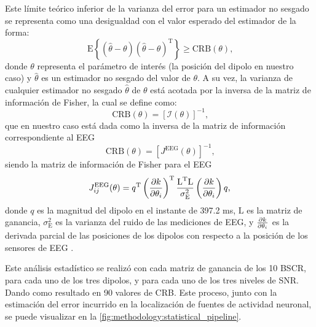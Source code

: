 Este límite teórico inferior de la varianza del error para un estimador no sesgado se representa como una desigualdad con el valor esperado del estimador de la forma:
\begin{equation}
	\label{eq:crb2}
	\text{E}\left\{(\hat{\theta} - \theta)(\hat{\theta} - \theta)^{\text{T}}\right\} \geq \text{CRB}(\theta)\text{,}
\end{equation}
donde ${\theta}$ representa el parámetro de interés (la posición del dipolo en nuestro caso) y $\hat{\theta}$ es un estimador no sesgado del valor de $\theta$. A su vez, la varianza de cualquier estimador no sesgado $\hat{\theta}$ de $\theta$ está acotada por la inversa de la matriz de información de Fisher, la cual se define como:
\begin{equation}
	\label{eq:crb}
	\text{CRB}(\theta) = \left[\mathcal{I}(\theta)\right]^{-1}\text{,}
\end{equation} 
que en nuestro caso está dada como la inversa de la matriz de información correspondiente al EEG
\begin{equation}
	\label{eq:crbj}
	\text{CRB}(\theta) = [J^{\text{EEG}}(\theta)]^{-1}\text{,}
\end{equation} 
siendo la matriz de información de Fisher para el EEG
\begin{equation}
	\label{eq:fisher}
	J_{ij}^{\text{EEG}}(\theta) = q^{\text{T}}\left(\pdv{k}{\theta_{i}}\right)^{\text{T}}\frac{\text{L}^{\text{T}}\text{L}}{\sigma^2_{\text{E}}}\left(\pdv{k}{\theta_{i}}\right)q\text{,}
\end{equation}
donde $q$ es la magnitud del dipolo en el instante de 397.2 ms, $\text{L}$ es la matriz de ganancia, $\sigma^2_{\text{E}}$ es la varianza del ruido de las mediciones de EEG, y $\pdv{k}{\theta_{i}}$ es la derivada parcial de las posiciones de los dipolos con respecto a la posición de los sensores de EEG \cite{nielsenCramerRaoLowerBound2013, Stoica1988, Muravchik1999}. 

Este análisis estadístico se realizó con cada matriz de ganancia de los 10 BSCR, para cada uno de los tres dipolos, y para cada uno de los tres niveles de SNR. 
Dando como resultado en 90 valores de CRB. 
Este proceso, junto con la estimación del error incurrido en la localización de fuentes de actividad neuronal, se puede visualizar en la \cref{fig:methodology:statistical_pipeline}.

